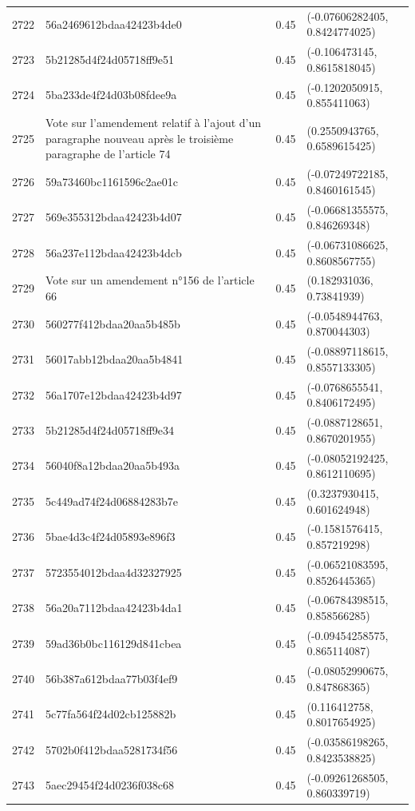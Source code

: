 \begin{table}[ht]
\begin{tabular}{rlrl}
  2722 & 56a2469612bdaa42423b4de0 & 0.45 & (-0.07606282405, 0.8424774025) \\ 
  2723 & 5b21285d4f24d05718ff9e51 & 0.45 & (-0.106473145, 0.8615818045) \\ 
  2724 & 5ba233de4f24d03b08fdee9a & 0.45 & (-0.1202050915, 0.855411063) \\ 
  2725 & Vote sur l'amendement relatif à l'ajout d'un paragraphe nouveau après le troisième paragraphe de l'article 74 & 0.45 & (0.2550943765, 0.6589615425) \\ 
  2726 & 59a73460bc1161596c2ae01c & 0.45 & (-0.07249722185, 0.8460161545) \\ 
  2727 & 569e355312bdaa42423b4d07 & 0.45 & (-0.06681355575, 0.846269348) \\ 
  2728 & 56a237e112bdaa42423b4dcb & 0.45 & (-0.06731086625, 0.8608567755) \\ 
  2729 & Vote sur un amendement n°156 de l'article 66 & 0.45 & (0.182931036, 0.73841939) \\ 
  2730 & 560277f412bdaa20aa5b485b & 0.45 & (-0.0548944763, 0.870044303) \\ 
  2731 & 56017abb12bdaa20aa5b4841 & 0.45 & (-0.08897118615, 0.8557133305) \\ 
  2732 & 56a1707e12bdaa42423b4d97 & 0.45 & (-0.0768655541, 0.8406172495) \\ 
  2733 & 5b21285d4f24d05718ff9e34 & 0.45 & (-0.0887128651, 0.8670201955) \\ 
  2734 & 56040f8a12bdaa20aa5b493a & 0.45 & (-0.08052192425, 0.8612110695) \\ 
  2735 & 5c449ad74f24d06884283b7e & 0.45 & (0.3237930415, 0.601624948) \\ 
  2736 & 5bae4d3c4f24d05893e896f3 & 0.45 & (-0.1581576415, 0.857219298) \\ 
  2737 & 5723554012bdaa4d32327925 & 0.45 & (-0.06521083595, 0.8526445365) \\ 
  2738 & 56a20a7112bdaa42423b4da1 & 0.45 & (-0.06784398515, 0.858566285) \\ 
  2739 & 59ad36b0bc116129d841cbea & 0.45 & (-0.09454258575, 0.865114087) \\ 
  2740 & 56b387a612bdaa77b03f4ef9 & 0.45 & (-0.08052990675, 0.847868365) \\ 
  2741 & 5c77fa564f24d02cb125882b & 0.45 & (0.116412758, 0.8017654925) \\ 
  2742 & 5702b0f412bdaa5281734f56 & 0.45 & (-0.03586198265, 0.8423538825) \\ 
  2743 & 5aec29454f24d0236f038c68 & 0.45 & (-0.09261268505, 0.860339719) \\ 

\end{tabular}
\end{table}
